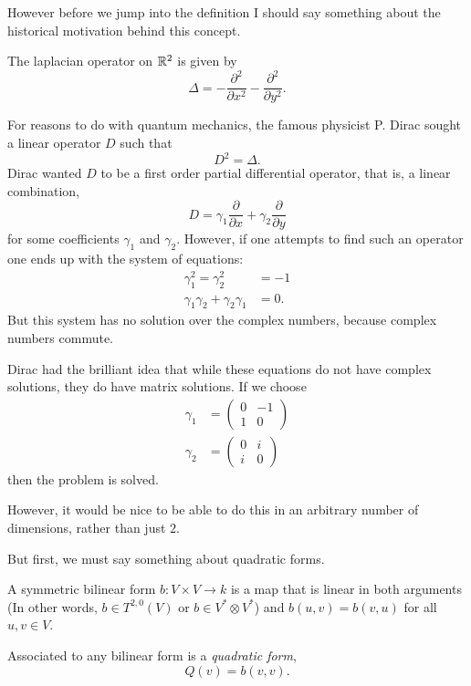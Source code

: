 However before we jump into the definition
I should say something about the historical motivation behind this concept.

The laplacian operator on $\mathbb{R}^2$ is given by
\begin{equation*}
    \Delta = -\frac{\partial^2}{\partial x^2}-\frac{\partial^2}{\partial y^2}.
\end{equation*}

For reasons to do with quantum mechanics, the famous physicist P. Dirac sought a linear
operator $D$ such that
\begin{equation*}
    D^2 = \Delta.
\end{equation*}
Dirac wanted $D$ to be a first order partial differential operator, that is,
a linear combination,
\begin{equation*}
    D = \gamma_1 \frac{\partial}{\partial x}+\gamma_2 \frac{\partial}{\partial y}
\end{equation*}
for some coefficients $\gamma_1$ and $\gamma_2$. However, if one attempts to find
such an operator one ends up with the system of equations:
\begin{align*}
    \gamma_1^2 = \gamma_2^2 &= -1\\
    \gamma_1\gamma_2+\gamma_2\gamma_1 &= 0.
\end{align*}
But this system has no solution over the complex numbers, because
complex numbers commute. 

Dirac had the brilliant idea that while these equations do not have complex solutions,
they do have matrix solutions.
If we choose
\begin{align*}
    \gamma_1 &= \begin{pmatrix} 0 & -1 \\ 1 & 0 \end{pmatrix}\\
    \gamma_2 &= \begin{pmatrix} 0 & i \\ i & 0 \end{pmatrix}
\end{align*}
then the problem is solved. 

However, it would be nice to be able to do this in an arbitrary number
of dimensions, rather than just $2$.

But first,
we must say something about quadratic forms.
\begin{definition}
    A symmetric bilinear form $b:V\times V\rightarrow k$
    is a map that is linear in both arguments (In other words, $b \in T^{2,0}(V)$
    or $b \in V^* \otimes V^*$) and $b(u,v) = b(v,u)$ for all $u,v \in V$. 

    Associated to any bilinear form is a \emph{quadratic form},
    \begin{equation*}
        Q(v) = b(v,v).
    \end{equation*}
\end{definition}


